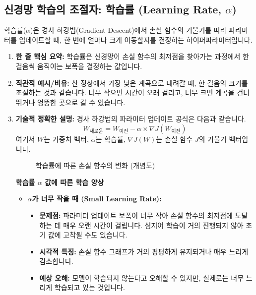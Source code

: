 \documentclass[11pt,a4paper]{article}
\theoremstyle{definition}
\begin{document}
\subsection{신경망 학습의 조절자: 학습률 (Learning Rate, $\alpha$)}
학습률($\alpha$)은 경사 하강법(Gradient Descent)에서 손실 함수의 기울기를 따라 파라미터를 업데이트할 때, 한 번에 얼마나 크게 이동할지를 결정하는 하이퍼파라미터입니다.

\begin{enumerate}
    \item \textbf{한 줄 핵심 요약:} 학습률은 신경망이 손실 함수의 최저점을 찾아가는 과정에서 한 걸음씩 움직이는 보폭을 결정하는 값입니다.
    \item \textbf{직관적 예시/비유:} 산 정상에서 가장 낮은 계곡으로 내려갈 때, 한 걸음의 크기를 조절하는 것과 같습니다. 너무 작으면 시간이 오래 걸리고, 너무 크면 계곡을 건너뛰거나 엉뚱한 곳으로 갈 수 있습니다.
    \item \textbf{기술적 정확한 설명:}
    경사 하강법의 파라미터 업데이트 공식은 다음과 같습니다.
    \begin{equation*}
    W_{\text{새로운}} = W_{\text{이전}} - \alpha \times \nabla J(W_{\text{이전}})
    \end{equation*}
    여기서 $W$는 가중치 벡터, $\alpha$는 학습률, $\nabla J(W)$는 손실 함수 $J$의 기울기 벡터입니다.

    \begin{figure}[h!]
    \centering
    \caption{학습률에 따른 손실 함수의 변화 (개념도)}
    \label{fig:learning_rate_effects}
    \end{figure}

    \textbf{학습률 $\alpha$ 값에 따른 학습 양상}
    \begin{itemize}
        \item \textbf{$\alpha$가 너무 작을 때 (Small Learning Rate):}
        \begin{itemize}
            \item \textbf{문제점:} 파라미터 업데이트 보폭이 너무 작아 손실 함수의 최저점에 도달하는 데 매우 오랜 시간이 걸립니다. 심지어 학습이 거의 진행되지 않아 초기 값에 고착될 수도 있습니다.
            \item \textbf{시각적 특징:} 손실 함수 그래프가 거의 평평하게 유지되거나 매우 느리게 감소합니다.
            \item \textbf{예상 오해:} 모델이 학습되지 않는다고 오해할 수 있지만, 실제로는 너무 느리게 학습되고 있는 것입니다.
        \end{itemize}


\end{itemize}
\end{enumerate}
\end{document}
